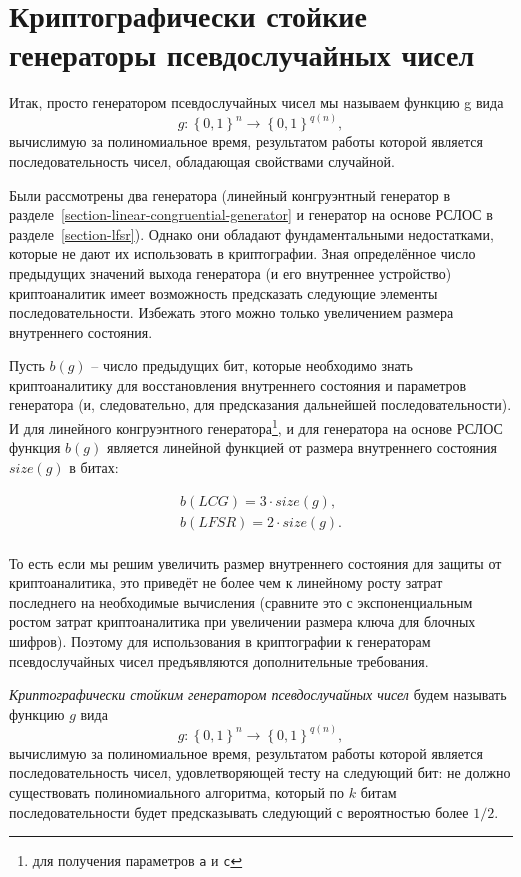 \section[КСГПСЧ]{Криптографически стойкие генераторы псевдослучайных чисел}

Итак, просто генератором псевдослучайных чисел мы называем функцию g вида
	\[g: \left\{0, 1\right\}^{n} \to \left\{0, 1\right\}^{q\left(n\right)},\]
вычислимую за полиномиальное время, результатом работы которой является последовательность чисел, обладающая свойствами случайной.

Были рассмотрены два генератора (линейный конгруэнтный генератор в разделе~\ref{section-linear-congruential-generator} и генератор на основе РСЛОС в разделе~\ref{section-lfsr}). Однако они обладают фундаментальными недостатками, которые не дают их использовать в криптографии. Зная определённое число предыдущих значений выхода генератора (и его внутреннее устройство) криптоаналитик имеет возможность предсказать следующие элементы последовательности. Избежать этого можно только увеличением размера внутреннего состояния.

Пусть $b \left( g \right)$ -- число предыдущих бит, которые необходимо знать криптоаналитику для восстановления внутреннего состояния и параметров генератора (и, следовательно, для предсказания дальнейшей последовательности). И для линейного конгруэнтного генератора\footnote{для получения параметров \texttt{a} и \texttt{c}}, и для генератора на основе РСЛОС функция $b (g)$ является линейной функцией от размера внутреннего состояния $size\left( g \right)$ в битах:

\[\begin{array}{l}
	b \left( LCG \right) = 3 \cdot size\left( g \right), \\
	b \left( LFSR \right) = 2 \cdot size\left( g \right). \\
\end{array}\]

То есть если мы решим увеличить размер внутреннего состояния для защиты от криптоаналитика, это приведёт не более чем к линейному росту затрат последнего на необходимые вычисления (сравните это с экспоненциальным ростом затрат криптоаналитика при увеличении размера ключа для блочных шифров). Поэтому для использования в криптографии к генераторам псевдослучайных чисел предъявляются дополнительные требования.

\textit{Криптографически стойким генератором псевдослучайных чисел} будем называть функцию $g$ вида
	\[g: \left\{0, 1\right\}^{n} \to \left\{0, 1\right\}^{q\left(n\right)},\] 
вычислимую за полиномиальное время, результатом работы которой является последовательность чисел, удовлетворяющей тесту на следующий бит: не должно существовать полиномиального алгоритма, который по $k$ битам последовательности будет предсказывать следующий с вероятностью более $1/2$.

